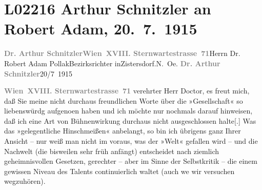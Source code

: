 

\section[Arthur Schnitzler an Robert Adam, 20. 7. 1915]{L02216 Arthur Schnitzler an Robert Adam, 20. 7. 1915}
\nopagebreak{}
\rehead{ }\normalsize\beginnumbering{}
\toendnotes[C]{\smallbreak\pagebreak[2]}
\pstart{}{\pb}\textcolor{gray}{\textbf{Dr. Arthur Schnitzler}}\pend{}\pstart{}\textcolor{gray}{\textbf{Wien XVIII. Sternwartestrasse 71}}\pend{}{\bigskip}\pstart{}{\pb}Herrn Dr. Robert Adam Pollak\pend{}\pstart{}Bezirksrichter in\pend{}\pstart{}Zistersdorf.\pend{}\pstart{}N. Oe.\pend{}{\bigskip}\vspace{1em}
\pstart
           {\pb}\textcolor{gray}{\textbf{Dr. Arthur Schnitzler}}\hfill 20/7 1915\pend
           
\pstart
           \textcolor{gray}{\textbf{Wien XVIII. Sternwartestrasse 71}}\pend
           \vspace{0.5em}
\pstart
           verehrter Herr Doctor, es freut mich, daß Sie meine nicht durchaus
               freundlichen Worte über die »Gesellschaft« so
               liebenswürdg aufgeno{\geminationm}en haben und ich möchte nur
               nochmals darauf hinweisen, daß ich eine Art von Bühnenwirkung durchaus nicht
               ausgeschlossen halte{[}.{]} Was das »gelegentliche Hinschmeißen«
               anbelangt, so bin ich übrigens ganz Ihrer Ansicht – nur weiß man nicht im voraus, was
               der »Welt« gefallen wird – und die Nachwelt (die bisweilen sehr früh anfängt) ent{\pb}scheidet nach ziemlich geheimnisvollen Gesetzen, gerechter
               – aber im Sinne der Selbstkritik – die einem gewissen Niveau des Talents
               continuierlich waltet (auch we{\geminationn} wir versuchen
               wegzuhören).\pend
           
